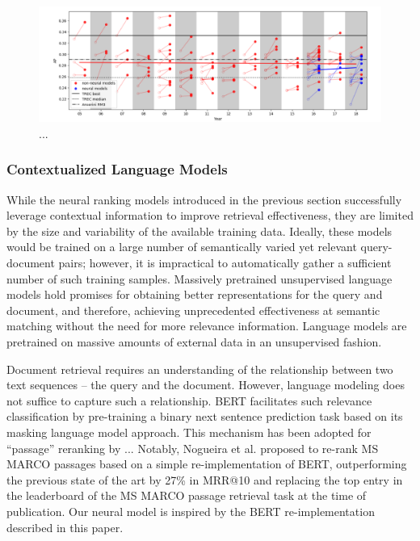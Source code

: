 \begin{figure}[b!]
\centering
  \includegraphics[width=6in]{neural_robust04.png}
\caption{...}
\label{fig:neural_robust04}
\end{figure}

\subsubsection{Contextualized Language Models}

While the neural ranking models introduced in the previous section successfully leverage contextual information to improve retrieval effectiveness, they are limited by the size and variability of the available training data.
Ideally, these models would be trained on a large number of semantically varied yet relevant query-document pairs; however, it is impractical to automatically gather a sufficient number of such training samples.
Massively pretrained unsupervised language models hold promises for obtaining better representations for the query and document, and therefore, achieving unprecedented effectiveness at semantic matching without the need for more relevance information.
Language models are pretrained on massive amounts of external data in an unsupervised fashion.

Document retrieval requires an understanding of the relationship between two text sequences -- the query and the document.
However, language modeling does not suffice to capture such a relationship.
BERT facilitates such relevance classification by pre-training a binary next sentence prediction task based on its masking language model approach.
This mechanism has been adopted for ``passage'' reranking by ...
Notably, Nogueira et al. \cite{nogueira2019passage} proposed to re-rank MS MARCO passages based on a simple re-implementation of BERT, outperforming the previous state of the art by 27\% in MRR@10 and replacing the top entry in the leaderboard of the MS MARCO passage retrieval task at the time of publication.
Our neural model is inspired by the BERT re-implementation described in this paper.

